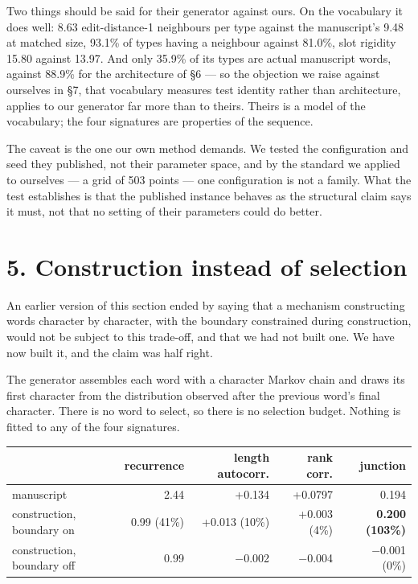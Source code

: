 \documentclass[11pt,a4paper]{article}
\begin{document}
Two things should be said for their generator against ours. On the vocabulary it does well: 8.63 edit-distance-1 neighbours per type against the manuscript's 9.48 at matched size, 93.1\% of types having a neighbour against 81.0\%, slot rigidity 15.80 against 13.97. And only 35.9\% of its types are actual manuscript words, against 88.9\% for the architecture of \S6 --- so the objection we raise against ourselves in \S7, that vocabulary measures test identity rather than architecture, applies to our generator far more than to theirs. Theirs is a model of the vocabulary; the four signatures are properties of the sequence.


The caveat is the one our own method demands. We tested the configuration and seed they published, not their parameter space, and by the standard we applied to ourselves --- a grid of 503 points --- one configuration is not a family. What the test establishes is that the published instance behaves as the structural claim says it must, not that no setting of their parameters could do better.


\section*{5. Construction instead of selection}


An earlier version of this section ended by saying that a mechanism constructing words character by character, with the boundary constrained during construction, would not be subject to this trade-off, and that we had not built one. We have now built it, and the claim was half right.


The generator assembles each word with a character Markov chain and draws its first character from the distribution observed after the previous word's final character. There is no word to select, so there is no selection budget. Nothing is fitted to any of the four signatures.


\begin{table}[htbp]\centering\small
\begin{tabular}{@{}lrrrr@{}}
\toprule
 & recurrence & length autocorr. & rank corr. & junction \\
\midrule
manuscript & 2.44 & +0.134 & +0.0797 & 0.194 \\
construction, boundary on & 0.99 (41\%) & +0.013 (10\%) & +0.003 (4\%) & \textbf{0.200 (103\%)} \\
construction, boundary off & 0.99 & $-$0.002 & $-$0.004 & $-$0.001 (0\%) \\
\bottomrule
\end{tabular}
\end{table}
\end{document}
